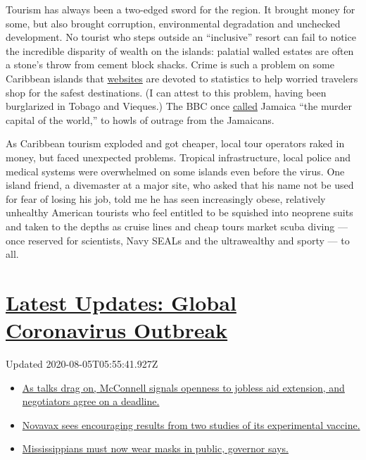 Tourism has always been a two-edged sword for the region. It brought
money for some, but also brought corruption, environmental degradation
and unchecked development. No tourist who steps outside an ``inclusive''
resort can fail to notice the incredible disparity of wealth on the
islands: palatial walled estates are often a stone's throw from cement
block shacks. Crime is such a problem on some Caribbean islands that
\href{https://www.tripsavvy.com/safest-and-most-dangerous-caribbean-islands-4157732}{websites}
are devoted to statistics to help worried travelers shop for the safest
destinations. (I can attest to this problem, having been burglarized in
Tobago and Vieques.) The BBC once
\href{http://www.bbc.co.uk/caribbean/news/story/2006/01/060103_murderlist.shtml}{called}
Jamaica ``the murder capital of the world,'' to howls of outrage from
the Jamaicans.

As Caribbean tourism exploded and got cheaper, local tour operators
raked in money, but faced unexpected problems. Tropical infrastructure,
local police and medical systems were overwhelmed on some islands even
before the virus. One island friend, a divemaster at a major site, who
asked that his name not be used for fear of losing his job, told me he
has seen increasingly obese, relatively unhealthy American tourists who
feel entitled to be squished into neoprene suits and taken to the depths
as cruise lines and cheap tours market scuba diving --- once reserved
for scientists, Navy SEALs and the ultrawealthy and sporty --- to all.

\hypertarget{latest-updates-global-coronavirus-outbreak}{%
\section{\texorpdfstring{\href{https://www.nytimes.com/2020/08/04/world/coronavirus-cases.html?action=click\&pgtype=Article\&state=default\&region=MAIN_CONTENT_1\&context=storylines_live_updates}{Latest
Updates: Global Coronavirus
Outbreak}}{Latest Updates: Global Coronavirus Outbreak}}\label{latest-updates-global-coronavirus-outbreak}}

Updated 2020-08-05T05:55:41.927Z

\begin{itemize}
\tightlist
\item
  \href{https://www.nytimes.com/2020/08/04/world/coronavirus-cases.html?action=click\&pgtype=Article\&state=default\&region=MAIN_CONTENT_1\&context=storylines_live_updates\#link-762df92}{As
  talks drag on, McConnell signals openness to jobless aid extension,
  and negotiators agree on a deadline.}
\item
  \href{https://www.nytimes.com/2020/08/04/world/coronavirus-cases.html?action=click\&pgtype=Article\&state=default\&region=MAIN_CONTENT_1\&context=storylines_live_updates\#link-1228a480}{Novavax
  sees encouraging results from two studies of its experimental
  vaccine.}
\item
  \href{https://www.nytimes.com/2020/08/04/world/coronavirus-cases.html?action=click\&pgtype=Article\&state=default\&region=MAIN_CONTENT_1\&context=storylines_live_updates\#link-794484ed}{Mississippians
  must now wear masks in public, governor says.}
\end{itemize}

